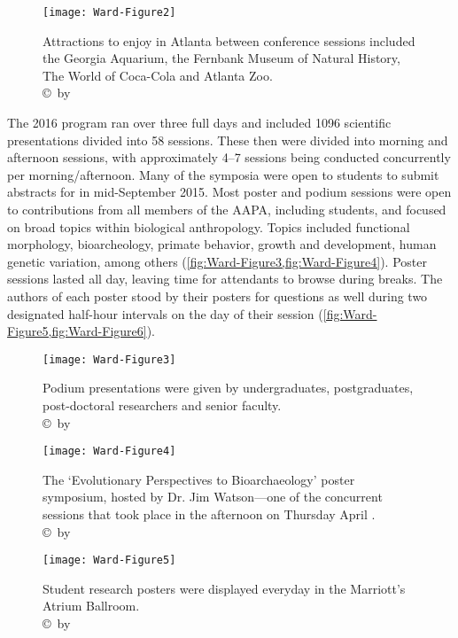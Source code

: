 \begin{figure}[!htb] %
		\centering
		\texttt{[image: Ward-Figure2]}
		\caption{Attractions to enjoy in Atlanta between conference sessions included the Georgia Aquarium, the Fernbank Museum of Natural History, The World of Coca-Cola and Atlanta Zoo. 
		{\normalfont\scriptsize \\ \copyright\ by \authortwo}}
		\label{fig:Ward-Figure2}
	\end{figure}
The 2016 program ran over three full days and included \num{1096} scientific presentations divided into 58 sessions.
These then were divided into morning and afternoon sessions, 
with approximately 4--7 sessions being conducted concurrently per morning/afternoon. 
Many of the symposia were open to students to submit abstracts for in mid-September 2015.
Most poster and podium sessions were open to contributions from all members of the AAPA, including students,
and focused on broad topics within biological anthropology.
Topics included functional morphology, bioarcheology, primate behavior, growth and development, human genetic variation,
among others (\cref{fig:Ward-Figure3,fig:Ward-Figure4}).
Poster sessions lasted all day, leaving time for attendants to browse during breaks.
The authors of each poster stood by their posters for questions as well during two designated half-hour intervals on
the day of their session (\cref{fig:Ward-Figure5,fig:Ward-Figure6}).

\begin{figure}[!htb] %
		\centering
		\texttt{[image: Ward-Figure3]}
		\caption{Podium presentations were given by undergraduates, postgraduates, post-doctoral researchers and senior faculty. 
		{\normalfont\scriptsize \\ \copyright\ by \authortwo}}
		\label{fig:Ward-Figure3}
	\end{figure}
	
	\begin{figure}[!htb] %
		\centering
		\texttt{[image: Ward-Figure4]}
		\caption{The ‘Evolutionary Perspectives to Bioarchaeology’ poster symposium, hosted by Dr. Jim Watson—one of the concurrent sessions that took place in the afternoon on Thursday April . 
		{\normalfont\scriptsize \\ \copyright\ by \authortwo}}
		\label{fig:Ward-Figure4}
	\end{figure}
	
	\begin{figure}[!htb] %
		\centering
		\texttt{[image: Ward-Figure5]}
		\caption{Student research posters were displayed everyday in the Marriott's Atrium Ballroom. 
		{\normalfont\scriptsize \\ \copyright\ by \authortwo}}
		\label{fig:Ward-Figure5}
	\end{figure}
	
